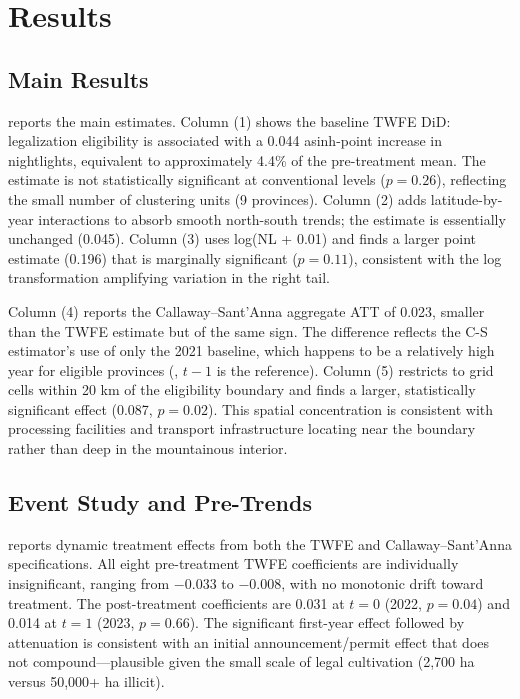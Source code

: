 \documentclass[12pt]{article}
\begin{document}
\section{Results}

\subsection{Main Results}

 reports the main estimates. Column (1) shows the baseline TWFE DiD: legalization eligibility is associated with a 0.044 asinh-point increase in nightlights, equivalent to approximately 4.4\% of the pre-treatment mean. The estimate is not statistically significant at conventional levels ($p = 0.26$), reflecting the small number of clustering units (9 provinces). Column (2) adds latitude-by-year interactions to absorb smooth north-south trends; the estimate is essentially unchanged (0.045). Column (3) uses log(NL + 0.01) and finds a larger point estimate (0.196) that is marginally significant ($p = 0.11$), consistent with the log transformation amplifying variation in the right tail.

Column (4) reports the Callaway--Sant'Anna aggregate ATT of 0.023, smaller than the TWFE estimate but of the same sign. The difference reflects the C-S estimator's use of only the 2021 baseline, which happens to be a relatively high year for eligible provinces (, $t - 1$ is the reference). Column (5) restricts to grid cells within 20 km of the eligibility boundary and finds a larger, statistically significant effect (0.087, $p = 0.02$). This spatial concentration is consistent with processing facilities and transport infrastructure locating near the boundary rather than deep in the mountainous interior.



\subsection{Event Study and Pre-Trends}

 reports dynamic treatment effects from both the TWFE and Callaway--Sant'Anna specifications. All eight pre-treatment TWFE coefficients are individually insignificant, ranging from $-0.033$ to $-0.008$, with no monotonic drift toward treatment. The post-treatment coefficients are 0.031 at $t = 0$ (2022, $p = 0.04$) and 0.014 at $t = 1$ (2023, $p = 0.66$). The significant first-year effect followed by attenuation is consistent with an initial announcement/permit effect that does not compound---plausible given the small scale of legal cultivation (2,700 ha versus 50,000+ ha illicit).
\end{document}
